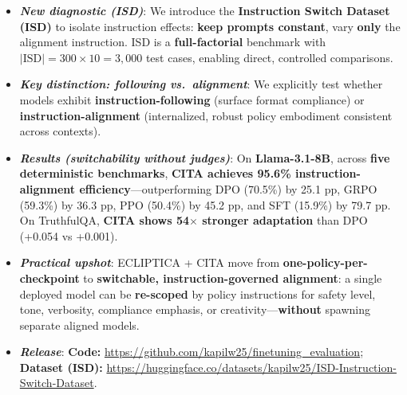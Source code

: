 \documentclass[11pt]{article}
\begin{document}
\begin{defin}
\begin{itemize}[left=-4pt,itemsep=0pt,topsep=0pt,parsep=0pt]
\item[\faVial] \textbf{\textit{New diagnostic (ISD)}}:
We introduce the \textbf{Instruction Switch Dataset (ISD)} to isolate instruction effects:
\textbf{keep prompts constant}, vary \textbf{only} the alignment instruction.
ISD is a \textbf{full-factorial} benchmark with
\(\lvert\text{ISD}\rvert = 300 \times 10 = 3{,}000\) test cases, enabling direct, controlled comparisons.

\item[\faBalanceScale] \textbf{\textit{Key distinction: following vs.\ alignment}}:
We explicitly test whether models exhibit \textbf{instruction-following} (surface format compliance)
or \textbf{instruction-alignment} (internalized, robust policy embodiment consistent across contexts).

\item[\faChartLine] \textbf{\textit{Results (switchability without judges)}}:
On \textbf{Llama-3.1-8B}, across \textbf{five deterministic benchmarks},
\textbf{CITA achieves \colorbox{bg-green}{95.6\%} instruction-alignment efficiency}---outperforming DPO (70.5\%) by 25.1 pp, GRPO (59.3\%) by 36.3 pp, PPO (50.4\%) by 45.2 pp, and SFT (15.9\%) by 79.7 pp.
On TruthfulQA, \textbf{CITA shows 54$\times$ stronger adaptation} than DPO (+0.054 vs +0.001).

\item[\faTools] \textbf{\textit{Practical upshot}}:
ECLIPTICA + CITA move from \textbf{one-policy-per-checkpoint} to \textbf{switchable, instruction-governed alignment}:
a single deployed model can be \textbf{re-scoped} by policy instructions for safety level, tone, verbosity, compliance emphasis, or creativity---\textbf{without} spawning separate aligned models.

\item[\faCode] \textbf{\textit{Release}}:
\textbf{Code:} \url{https://github.com/kapilw25/finetuning_evaluation};
\textbf{Dataset (ISD):} \url{https://huggingface.co/datasets/kapilw25/ISD-Instruction-Switch-Dataset}.


\end{itemize}
\vspace{-2mm}
\end{defin}

















\end{document}
